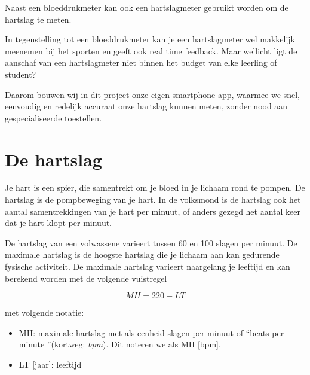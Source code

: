 Naast een bloeddrukmeter kan ook een hartslagmeter gebruikt worden om de hartslag te meten. 

\begin{minipage}{.5\linewidth}
\end{minipage} 
\begin{minipage}{.5\linewidth}
\end{minipage} 

In tegenstelling tot een bloeddrukmeter kan je een hartslagmeter wel makkelijk meenemen bij het sporten en geeft ook real time feedback. Maar wellicht ligt de aanschaf van een hartslagmeter niet binnen het budget van elke leerling of student?

Daarom bouwen wij in dit project onze eigen smartphone app, waarmee we snel, eenvoudig en redelijk accuraat onze hartslag kunnen meten, zonder nood aan gespecialiseerde toestellen.


\section{De hartslag}
\label{sec:Mod1_Sec2}

Je hart is een spier, die samentrekt om je bloed in je lichaam rond te pompen. De hartslag is de pompbeweging van je hart. In de volksmond is de hartslag ook het aantal samentrekkingen van je hart per minuut, of anders gezegd het aantal keer dat je hart klopt per minuut.

De hartslag van een volwassene varieert tussen 60 en 100 slagen per minuut. De maximale hartslag is de hoogste hartslag die je lichaam aan kan gedurende fysische activiteit. De maximale hartslag varieert naargelang je leeftijd en kan berekend worden met de volgende vuistregel

\begin{equation*}
MH = 220-LT
\end{equation*}

met volgende notatie:
\begin{itemize}
	\item MH: maximale hartslag met als eenheid slagen per minuut of \textquotedblleft beats per minute \textquotedblright (kortweg: \emph{bpm}). 
	Dit noteren we als MH [bpm].
	\item LT [jaar]: leeftijd
\end{itemize}

